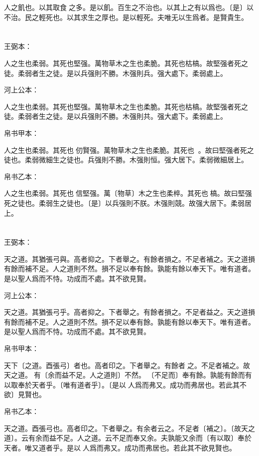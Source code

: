 \documentclass[a5paper]{ctexbook}
\begin{document}
    人之飢也。以其取食𨁑之多。是以飢。百生之不治也。以其上之有以爲也。〔是〕以不治。民之輕死也。以其求生之厚也。是以輕死。夫唯无以生爲者。是賢貴生。

    \chapter{}
    王弼本：

    人之生也柔弱。其死也堅强。萬物草木之生也柔脆。其死也枯槁。故堅强者死之徒。柔弱者生之徒。是以兵强則不勝。木强則兵。强大處下。柔弱處上。

    河上公本：

    人之生也柔弱。其死也堅强。萬物草木之生也柔脆。其死也枯槁。故堅强者死之徒。柔弱者生之徒。是以兵强則不勝。木强則共。强大處下。柔弱處上。

    帛书甲本：

    人之生也柔弱。其死也𦵕仞賢强。萬物草木之生也柔脆。其死也𣒞𩫓。故曰堅强者死之徒也。柔弱微細生之徒也。兵强則不勝。木强則恒。强大居下。柔弱微細居上。

    帛书乙本：

    人之生也柔弱。其死也󱁌信堅强。萬〔物草〕木之生也柔椊。其死也𣒞槁。故曰堅强死之徒也。柔弱生之徒也。〔是〕以兵强則不朕。木强則競。故强大居下。柔弱居上。

    \chapter{}
    王弼本：

    天之道。其猶張弓與。高者抑之。下者舉之。有餘者損之。不足者補之。天之道損有餘而補不足。人之道則不然。損不足以奉有餘。孰能有餘以奉天下。唯有道者。是以聖人爲而不恃。功成而不處。其不欲見賢。

    河上公本：

    天之道。其猶張弓乎。高者抑之。下者舉之。有餘者損之。不足者益之。天之道損有餘而補不足。人之道則不然。損不足以奉有餘。孰能有餘以奉天下。唯有道者。是以聖人爲而不恃。功成而不處。其不欲見賢。

    帛书甲本：

    天下〔之道。酉張弓〕者也。高者印之。下者舉之。有餘者𢿃之。不足者補之。故天之道。𢿃有〔余而益不足。人之道則〕不然。𢿃〔不足而〕奉有餘。孰能有餘而有以取奉於天者乎。〔唯有道者乎〕。〔是以𦔻人爲而弗又。成功而弗居也。若此其不欲〕見賢也。

    帛书乙本：

    天之道。酉張弓也。高者印之。下者舉之。有余者云之。不足者〔補之〕。〔故天之道〕。云有余而益不足。人之道。云不足而奉又余。夫孰能又余而〔有以取〕奉於天者。唯又道者乎。是以𦔻人爲而弗又。成功而弗居也。若此其不欲見賢也。
\end{document}
